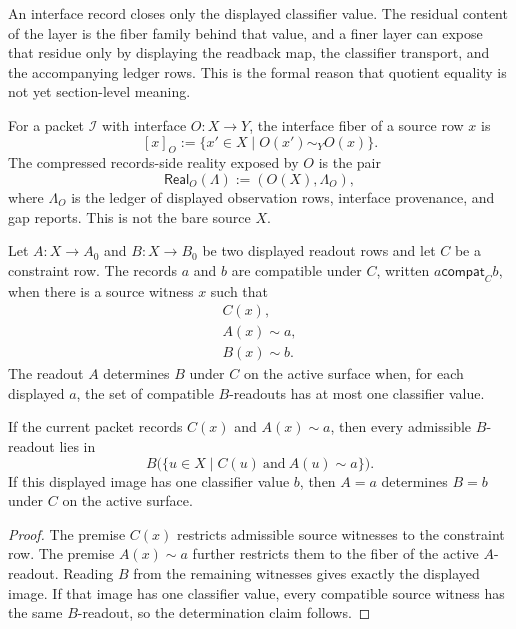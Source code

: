 \begin{principle}
\label{prin:interface-layer-residue-fiber-data}
An interface record closes only the displayed classifier value. The
residual content of the layer is the fiber family behind that value, and
a finer layer can expose that residue only by displaying the readback map,
the classifier transport, and the accompanying ledger rows. This is the
formal reason that quotient equality is not yet section-level meaning.
\end{principle}

\begin{definition}
\label{def:interface-fiber-compressed-reality}
For a packet $\mathcal I$ with interface $O:X\to Y$, the interface fiber
of a source row $x$ is
$$
[x]_O:=\{x'\in X\mid O(x')\sim_Y O(x)\}.
$$
The compressed records-side reality exposed by $O$ is the pair
$$
\mathsf{Real}_O(\Lambda):=(O(X),\Lambda_O),
$$
where $\Lambda_O$ is the ledger of displayed observation rows, interface
provenance, and gap reports. This is not the bare source $X$.
\end{definition}

\begin{definition}
\label{def:interface-constraint-compatibility}
Let $A:X\to A_0$ and $B:X\to B_0$ be two displayed readout rows and let
$C$ be a constraint row. The records $a$ and $b$ are compatible under
$C$, written $a\mathrel{\mathsf{compat}_C}b$, when there is a source
witness $x$ such that
$$
\begin{gathered}
C(x),\\
A(x)\sim a,\\
B(x)\sim b.
\end{gathered}
$$
The readout $A$ determines $B$ under $C$ on the active surface when, for
each displayed $a$, the set of compatible $B$-readouts has at most one
classifier value.
\end{definition}

\begin{theorem}
\label{thm:interface-constraint-projection}
If the current packet records $C(x)$ and $A(x)\sim a$, then every
admissible $B$-readout lies in
$$
B\bigl(\{u\in X\mid C(u)\ \mathrm{and}\ A(u)\sim a\}\bigr).
$$
If this displayed image has one classifier value $b$, then $A=a$
determines $B=b$ under $C$ on the active surface.
\end{theorem}

\begin{proof}
The premise $C(x)$ restricts admissible source witnesses to the
constraint row. The premise $A(x)\sim a$ further restricts them to the
fiber of the active $A$-readout. Reading $B$ from the remaining witnesses
gives exactly the displayed image. If that image has one classifier value,
every compatible source witness has the same $B$-readout, so the
determination claim follows.
\end{proof}

